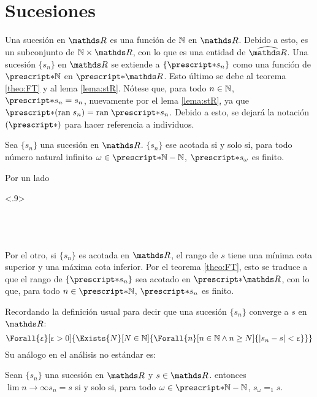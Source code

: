 \section{Sucesiones}

Una sucesión en $\R$ es una función de $\mathbb{N}$ en $\R$. Debido a esto, es
un subconjunto de $\N\times\R$, con lo que es una entidad de $\Rh$.
Una sucesión $\{s_n\}$ en $\R$ se extiende a $\{\st{s_n}\}$ como una función de 
$\st{\N}$ en $\st{\R}$. Esto último se debe al teorema \ref{theo:FT} y
al lema \ref{lema:stR}. Nótese que, para todo $n\in\mathbb{N}$, $\st{s_n} = s_n$,
nuevamente por el lema \ref{lema:stR}, ya que $\st{(\ran s_n)} = \ran \st{s_n}$.
Debido a esto, se dejará la notación $(\st{})$ para hacer referencia a
individuos.

\begin{theorem}
  Sea $\{s_n\}$ una sucesión en $\R$. $\{s_n\}$ ese acotada si y solo si, para todo
  número natural infinito $\omega\in\st{\N}-\N$, $\st{s_\omega}$ es
  finito.
\end{theorem}

\begin{demo}
  Por un lado
  \begin{longderivation}<.9>
      \\
    \\
      \\
    \equiv\\
  \end{longderivation}
  Por el otro, si $\{s_n\}$ es acotada en $\R$, el rango de $s$ tiene una
  mínima cota superior y una máxima cota inferior. Por el teorema
  \ref{theo:FT}, esto se traduce a que el rango de $\{\st{s_n}\}$ sea acotado
  en $\st{\R}$, con lo que, para todo $n\in\st{\N}$, $\st{s_n}$ es finito.
\end{demo}

Recordando la definición usual para decir que una sucesión $\{s_n\}$
converge a $s$ en $\R$:
\[\Forall{\e}[\e>0]{\Exists{N}[N\in\N]{\Forall{n}[n\in\N \land n\geq N]{|s_n - s| < \e}}}\]
Su análogo en el análisis no estándar es:
\begin{theorem}
  Sean $\{s_n\}$ una sucesión en $\R$ y $s\in\R$. entonces 
  $\lim{n\to\infty} s_n = s$ si y solo si, para todo $\omega\in\st{\N} - \N$,
  $s_\omega =_1 s$.
\end{theorem}


